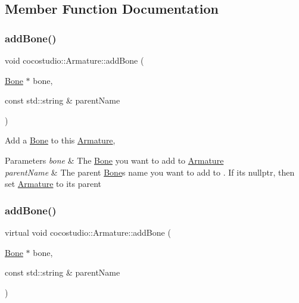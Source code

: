 \subsection{Member Function Documentation}
\mbox{\label{classcocostudio_1_1Armature_af7a204c1c43c67de2c29c9d3dff58c55}} 
\subsubsection{\texorpdfstring{add\+Bone()}{addBone()}\hspace{0.1cm}{\footnotesize\ttfamily [1/2]}}
{\footnotesize\ttfamily void cocostudio\+::\+Armature\+::add\+Bone (\begin{DoxyParamCaption}\item[{\hyperlink{classcocostudio_1_1Bone}{Bone} $\ast$}]{bone,  }\item[{const std\+::string \&}]{parent\+Name }\end{DoxyParamCaption})\hspace{0.3cm}{\ttfamily [virtual]}}

Add a \hyperlink{classcocostudio_1_1Bone}{Bone} to this \hyperlink{classcocostudio_1_1Armature}{Armature},


\begin{DoxyParams}{Parameters}
{\em bone} & The \hyperlink{classcocostudio_1_1Bone}{Bone} you want to add to \hyperlink{classcocostudio_1_1Armature}{Armature} \\
\hline
{\em parent\+Name} & The parent \hyperlink{classcocostudio_1_1Bone}{Bone}\textquotesingle{}s name you want to add to . If it\textquotesingle{}s nullptr, then set \hyperlink{classcocostudio_1_1Armature}{Armature} to its parent \\
\hline
\end{DoxyParams}
\mbox{\label{classcocostudio_1_1Armature_a59f16d46413e78cf4b8cdcf17daa0971}} 
\subsubsection{\texorpdfstring{add\+Bone()}{addBone()}\hspace{0.1cm}{\footnotesize\ttfamily [2/2]}}
{\footnotesize\ttfamily virtual void cocostudio\+::\+Armature\+::add\+Bone (\begin{DoxyParamCaption}\item[{\hyperlink{classcocostudio_1_1Bone}{Bone} $\ast$}]{bone,  }\item[{const std\+::string \&}]{parent\+Name }\end{DoxyParamCaption})\hspace{0.3cm}{\ttfamily [virtual]}}

